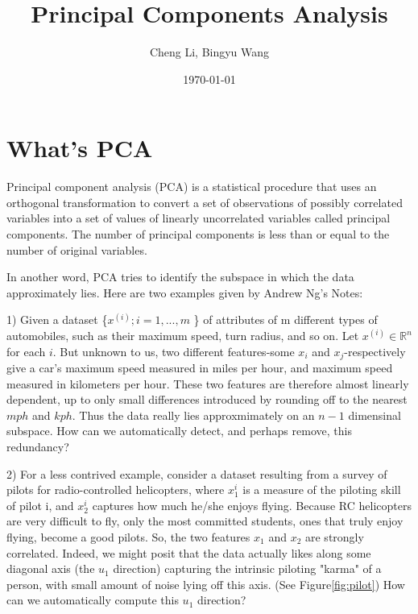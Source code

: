 \documentclass[a4paper]{article}
\title{Principal Components Analysis}
\author{Cheng Li, Bingyu Wang}
\date{\today}
\begin{document}
\maketitle
\section{What's PCA}

Principal component analysis (PCA) is a statistical procedure that uses an orthogonal transformation to convert a set of observations of possibly correlated variables into a set of values of linearly uncorrelated variables called principal components. The number of principal components is less than or equal to the number of original variables. 

In another word, PCA tries to identify the subspace in which the data approximately lies. Here are two examples given by Andrew Ng's Notes:

	1) Given a dataset \{$x^{(i)}; i = 1, ..., m$ \} of attributes of m different types of automobiles, such as their maximum speed, turn radius, and so on. Let $x^{(i)} \in \mathbb{R}^{n}$ for each $i$. But unknown to us, two different features-some $x_i$ and $x_j$-respectively give a car's maximum speed measured in miles per hour, and maximum speed measured in kilometers per hour. These two features are therefore almost linearly dependent, up to only small differences introduced by rounding off to the nearest $mph$ and $kph$. Thus the data really lies approxmimately on an $n-1$ dimensinal subspace. How can we automatically detect, and perhaps remove, this redundancy?
    
    2) For a less contrived example, consider a dataset resulting from a survey of pilots for radio-controlled helicopters, where $x_1^{i}$ is a measure of the piloting skill of pilot i, and $x_2^{i}$ captures how much he/she enjoys flying. Because RC helicopters are very difficult to fly, only the most committed students, ones that truly enjoy flying, become a good pilots. So, the two features $x_1$ and $x_2$ are strongly correlated. Indeed, we might posit that the data actually likes along some diagonal axis (the $u_1$ direction) capturing the intrinsic piloting "karma" of a person, with small amount of noise lying off this axis. (See Figure\ref{fig:pilot}) How can we automatically compute this $u_1$ direction?
    
\end{document}
